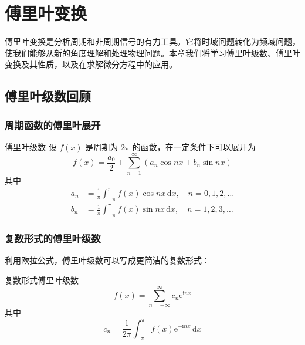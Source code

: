 
\chapter{傅里叶变换}

\begin{wulibj}[本章导读]
傅里叶变换是分析周期和非周期信号的有力工具。它将时域问题转化为频域问题，使我们能够从新的角度理解和处理物理问题。本章我们将学习傅里叶级数、傅里叶变换及其性质，以及在求解微分方程中的应用。
\end{wulibj}

\section{傅里叶级数回顾}

\subsection{周期函数的傅里叶展开}

\begin{dingliyi}{}{傅里叶级数}
设 $f(x)$ 是周期为 $2\pi$ 的函数，在一定条件下可以展开为
\begin{equation}
    f(x) = \frac{a_0}{2} + \sum_{n=1}^{\infty}(a_n\cos nx + b_n\sin nx)
\end{equation}
其中
\begin{align}
    a_n &= \frac{1}{\pi}\int_{-\pi}^{\pi} f(x)\cos nx\,\mathrm{d}x, \quad n = 0, 1, 2, \ldots \\
    b_n &= \frac{1}{\pi}\int_{-\pi}^{\pi} f(x)\sin nx\,\mathrm{d}x, \quad n = 1, 2, 3, \ldots
\end{align}
\end{dingliyi}

\subsection{复数形式的傅里叶级数}

利用欧拉公式，傅里叶级数可以写成更简洁的复数形式：

\begin{dingli}{}{复数形式傅里叶级数}
\begin{equation}
    f(x) = \sum_{n=-\infty}^{\infty} c_n\mathrm{e}^{\mathrm{i}nx}
\end{equation}
其中
\begin{equation}
    c_n = \frac{1}{2\pi}\int_{-\pi}^{\pi} f(x)\mathrm{e}^{-\mathrm{i}nx}\,\mathrm{d}x
\end{equation}
\end{dingli}

